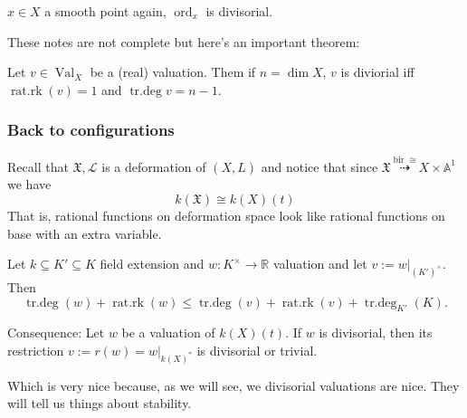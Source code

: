 \begin{example}\leavevmode
\(x \in X\) a smooth point again, \(\operatorname{ord}_x\) is divisorial. 
\end{example}

These notes are not complete but here's an important theorem:

\begin{thm}[Zerisky]\leavevmode
Let \(v \in \operatorname{Val}_X\) be a (real) valuation. Them if  \(n=\dim X\), \(v\) is diviorial iff \(\operatorname{r a t . r k}(v)=1\) and \(\operatorname{tr.de g}v=n-1\).
\end{thm}

\subsubsection{Back to configurations}

Recall that \(\mathfrak{X},\mathcal{L}\) is a deformation of \((X,L)\) and notice that since  \(\mathfrak{X}  \overset{\operatorname{bir}\cong}{ \dashrightarrow} X \times \mathbb{A}^1\) we have
\[k(\mathfrak{X}) \cong k(X)(t)\]
That is, rational functions on deformation space look like rational functions on base with an extra variable.

\begin{thm}\leavevmode
Let \(k \subseteq K' \subseteq K\) field extension and \(w: K^\times \longrightarrow \mathbb{R}\) valuation and let  \(v:=w |_{(K')^\times}\). Then
\[\operatorname{tr.de g}(w)+\operatorname{r a t. r k}(w) \leq \operatorname{tr.de g}(v)+\operatorname{r a t.r k}(v)+\operatorname{tr.de g}_{K'}(K).\]
\end{thm}

\begin{thing8}{Consequence:}\leavevmode
Let \(w\) be a valuation of \(k(X)(t)\). If \(w\) is divisorial, then its restriction \(v:=r(w)=w|_{k(X)^*}\) is divisorial or trivial.
\end{thing8}

Which is very nice because, as we will see, we divisorial valuations are nice. They will tell us things about stability.

